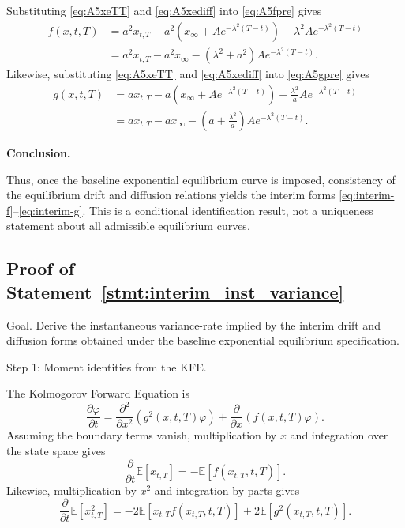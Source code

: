 \documentclass[12pt]{article}
\theoremstyle{statementstyle}
\begin{document}
\begin{appendices}
Substituting \eqref{eq:A5xeTT} and \eqref{eq:A5xediff} into
\eqref{eq:A5fpre} gives
\begin{align}
f(x,t,T)
&=
a^{2}x_{t,T}
-
a^{2}\!\left(x_{\infty}+A e^{-\lambda^{2}(T-t)}\right)
-
\lambda^{2}A e^{-\lambda^{2}(T-t)}
\nonumber\\
&=
a^{2}x_{t,T}
-
a^{2}x_{\infty}
-
(\lambda^{2}+a^{2})A e^{-\lambda^{2}(T-t)}.
\tag{A.5.6}\label{eq:A51}
\end{align}
Likewise, substituting \eqref{eq:A5xeTT} and \eqref{eq:A5xediff} into
\eqref{eq:A5gpre} gives
\begin{align}
g(x,t,T)
&=
a x_{t,T}
-
a\!\left(x_{\infty}+A e^{-\lambda^{2}(T-t)}\right)
-
\frac{\lambda^{2}}{a}A e^{-\lambda^{2}(T-t)}
\nonumber\\
&=
a x_{t,T}
-
a x_{\infty}
-
\left(a+\frac{\lambda^{2}}{a}\right)
A e^{-\lambda^{2}(T-t)}.
\tag{A.5.7}\label{eq:A52}
\end{align}

\medskip
\noindent\textbf{Conclusion.}

Thus, once the baseline exponential equilibrium curve is imposed,
consistency of the equilibrium drift and diffusion relations yields the
interim forms \eqref{eq:interim-f}--\eqref{eq:interim-g}. This is a
conditional identification result, not a uniqueness statement about all
admissible equilibrium curves.

\subsection{Proof of Statement~\ref{stmt:interim_inst_variance}}
\label{appendix:A6}

Goal. Derive the instantaneous variance-rate implied by the interim drift and diffusion
forms obtained under the baseline exponential equilibrium specification.

Step 1: Moment identities from the KFE.

The Kolmogorov Forward Equation is
\[
\frac{\partial \varphi}{\partial t}
=
\frac{\partial^2}{\partial x^2}\left(g^2(x,t,T)\varphi\right)
+
\frac{\partial}{\partial x}\left(f(x,t,T)\varphi\right).
\]
Assuming the boundary terms vanish, multiplication by \(x\) and integration over the
state space gives
\[
\frac{\partial}{\partial t}\mathbb E[x_{t,T}]
=
-\mathbb E[f(x_{t,T},t,T)].
\]
Likewise, multiplication by \(x^2\) and integration by parts gives
\[
\frac{\partial}{\partial t}\mathbb E[x_{t,T}^2]
=
-2\mathbb E[x_{t,T}f(x_{t,T},t,T)]
+
2\mathbb E[g^2(x_{t,T},t,T)].
\]


\end{appendices}
\end{document}
